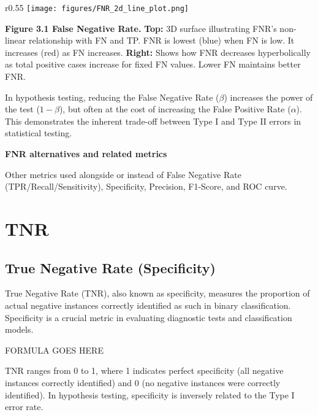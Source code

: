 \begin{wrapfigure}{r}{0.55\textwidth}
    \centering
    \vspace{-20pt} %
    \texttt{[image: figures/FNR\_2d\_line\_plot.png]} %
\end{wrapfigure}

\textbf{Figure 3.1 False Negative Rate.} 
\textbf{Top:}
3D surface illustrating FNR's non-linear relationship with FN and TP. FNR is lowest (blue) when FN is low. It increases (red) as FN increases.
\textbf{Right:}
Shows how FNR decreases hyperbolically as total positive cases increase for fixed FN values. Lower FN maintains better FNR.


{
    In hypothesis testing, reducing the False Negative Rate ($\beta$) increases the power of the test ($1 - \beta$), but often at the cost of increasing the False Positive Rate ($\alpha$).
    This demonstrates the inherent trade-off between Type I and Type II errors in statistical testing.
}

\textbf{FNR alternatives and related metrics}

Other metrics used alongside or instead of False Negative Rate (TPR/Recall/Sensitivity), Specificity, Precision, F1-Score, and ROC curve.

\clearpage
\thispagestyle{classificationstyle}
\section{TNR}
\subsection{True Negative Rate (Specificity)}

True Negative Rate (TNR), also known as specificity, measures the proportion of actual negative instances correctly identified as such in binary classification.
Specificity is a crucial metric in evaluating diagnostic tests and classification models.

\begin{center}
    FORMULA GOES HERE
\end{center}

TNR ranges from 0 to 1, where 1 indicates perfect specificity (all negative instances correctly identified) and 0 (no negative instances were correctly identified).
In hypothesis testing, specificity is inversely related to the Type I error rate.

